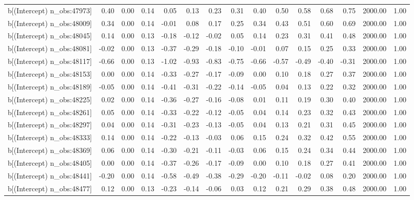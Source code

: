 \begin{table}[ht]
\begin{tabular}{rrrrrrrrrrrrrrr}
  b[(Intercept) n\_obs:47973] & 0.40 & 0.00 & 0.14 & 0.05 & 0.13 & 0.23 & 0.31 & 0.40 & 0.50 & 0.58 & 0.68 & 0.75 & 2000.00 & 1.00 \\ 
  b[(Intercept) n\_obs:48009] & 0.34 & 0.00 & 0.14 & -0.01 & 0.08 & 0.17 & 0.25 & 0.34 & 0.43 & 0.51 & 0.60 & 0.69 & 2000.00 & 1.00 \\ 
  b[(Intercept) n\_obs:48045] & 0.14 & 0.00 & 0.13 & -0.18 & -0.12 & -0.02 & 0.05 & 0.14 & 0.23 & 0.31 & 0.41 & 0.48 & 2000.00 & 1.00 \\ 
  b[(Intercept) n\_obs:48081] & -0.02 & 0.00 & 0.13 & -0.37 & -0.29 & -0.18 & -0.10 & -0.01 & 0.07 & 0.15 & 0.25 & 0.33 & 2000.00 & 1.00 \\ 
  b[(Intercept) n\_obs:48117] & -0.66 & 0.00 & 0.13 & -1.02 & -0.93 & -0.83 & -0.75 & -0.66 & -0.57 & -0.49 & -0.40 & -0.31 & 2000.00 & 1.00 \\ 
  b[(Intercept) n\_obs:48153] & 0.00 & 0.00 & 0.14 & -0.33 & -0.27 & -0.17 & -0.09 & 0.00 & 0.10 & 0.18 & 0.27 & 0.37 & 2000.00 & 1.00 \\ 
  b[(Intercept) n\_obs:48189] & -0.05 & 0.00 & 0.14 & -0.41 & -0.31 & -0.22 & -0.14 & -0.05 & 0.04 & 0.13 & 0.22 & 0.32 & 2000.00 & 1.00 \\ 
  b[(Intercept) n\_obs:48225] & 0.02 & 0.00 & 0.14 & -0.36 & -0.27 & -0.16 & -0.08 & 0.01 & 0.11 & 0.19 & 0.30 & 0.40 & 2000.00 & 1.00 \\ 
  b[(Intercept) n\_obs:48261] & 0.05 & 0.00 & 0.14 & -0.33 & -0.22 & -0.12 & -0.05 & 0.04 & 0.14 & 0.23 & 0.32 & 0.43 & 2000.00 & 1.00 \\ 
  b[(Intercept) n\_obs:48297] & 0.04 & 0.00 & 0.14 & -0.31 & -0.23 & -0.13 & -0.05 & 0.04 & 0.13 & 0.21 & 0.31 & 0.45 & 2000.00 & 1.00 \\ 
  b[(Intercept) n\_obs:48333] & 0.14 & 0.00 & 0.14 & -0.22 & -0.13 & -0.03 & 0.06 & 0.15 & 0.24 & 0.32 & 0.42 & 0.55 & 2000.00 & 1.00 \\ 
  b[(Intercept) n\_obs:48369] & 0.06 & 0.00 & 0.14 & -0.30 & -0.21 & -0.11 & -0.03 & 0.06 & 0.15 & 0.24 & 0.34 & 0.44 & 2000.00 & 1.00 \\ 
  b[(Intercept) n\_obs:48405] & 0.00 & 0.00 & 0.14 & -0.37 & -0.26 & -0.17 & -0.09 & 0.00 & 0.10 & 0.18 & 0.27 & 0.41 & 2000.00 & 1.00 \\ 
  b[(Intercept) n\_obs:48441] & -0.20 & 0.00 & 0.14 & -0.58 & -0.49 & -0.38 & -0.29 & -0.20 & -0.11 & -0.02 & 0.08 & 0.20 & 2000.00 & 1.00 \\ 
  b[(Intercept) n\_obs:48477] & 0.12 & 0.00 & 0.13 & -0.23 & -0.14 & -0.06 & 0.03 & 0.12 & 0.21 & 0.29 & 0.38 & 0.48 & 2000.00 & 1.00 \\ 

\end{tabular}
\end{table}
